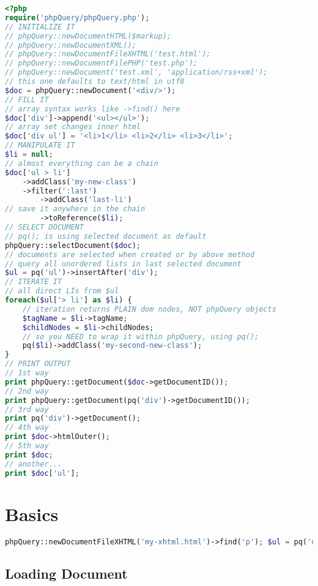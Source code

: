 \begin{lstlisting}[language=PHP]
<?php
require('phpQuery/phpQuery.php');
// INITIALIZE IT
// phpQuery::newDocumentHTML($markup);
// phpQuery::newDocumentXML();
// phpQuery::newDocumentFileXHTML('test.html');
// phpQuery::newDocumentFilePHP('test.php');
// phpQuery::newDocument('test.xml', 'application/rss+xml');
// this one defaults to text/html in utf8
$doc = phpQuery::newDocument('<div/>');
// FILL IT
// array syntax works like ->find() here
$doc['div']->append('<ul></ul>');
// array set changes inner html
$doc['div ul'] = '<li>1</li> <li>2</li> <li>3</li>';
// MANIPULATE IT
$li = null;
// almost everything can be a chain
$doc['ul > li']
	->addClass('my-new-class')
	->filter(':last')
		->addClass('last-li')
// save it anywhere in the chain
		->toReference($li);
// SELECT DOCUMENT
// pq(); is using selected document as default
phpQuery::selectDocument($doc);
// documents are selected when created or by above method
// query all unordered lists in last selected document
$ul = pq('ul')->insertAfter('div');
// ITERATE IT
// all direct LIs from $ul
foreach($ul['> li'] as $li) {
	// iteration returns PLAIN dom nodes, NOT phpQuery objects
	$tagName = $li->tagName;
	$childNodes = $li->childNodes;
	// so you NEED to wrap it within phpQuery, using pq();
	pq($li)->addClass('my-second-new-class');
}
// PRINT OUTPUT
// 1st way
print phpQuery::getDocument($doc->getDocumentID());
// 2nd way
print phpQuery::getDocument(pq('div')->getDocumentID());
// 3rd way
print pq('div')->getDocument();
// 4th way
print $doc->htmlOuter();
// 5th way
print $doc;
// another...
print $doc['ul'];
\end{lstlisting}

\section{Basics}





\begin{lstlisting}[language=PHP]
phpQuery::newDocumentFileXHTML('my-xhtml.html')->find('p'); $ul = pq('ul');
\end{lstlisting}


\subsection{Loading Document}


